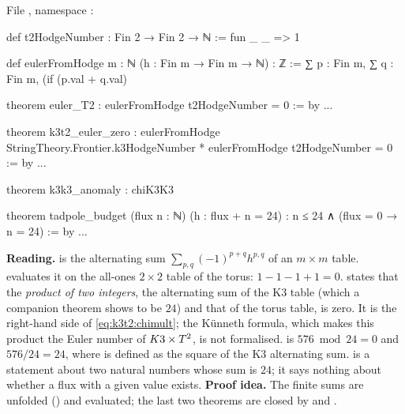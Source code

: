 \begin{leanbox}
File , namespace :
\begin{leancode}
def t2HodgeNumber : Fin 2 → Fin 2 → ℕ := fun _ _ => 1

def eulerFromHodge {m : ℕ} (h : Fin m → Fin m → ℕ) : ℤ :=
  ∑ p : Fin m, ∑ q : Fin m,
    (if (p.val + q.val) %

theorem euler_T2 : eulerFromHodge t2HodgeNumber = 0 := by ...

theorem k3t2_euler_zero :
    eulerFromHodge StringTheory.Frontier.k3HodgeNumber
      * eulerFromHodge t2HodgeNumber = 0 := by ...

theorem k3k3_anomaly : chiK3K3 %

theorem tadpole_budget (flux n : ℕ) (h : flux + n = 24) :
    n ≤ 24 ∧ (flux = 0 → n = 24) := by ...
\end{leancode}
\textbf{Reading.}  is the alternating sum
$\sum_{p,q}(-1)^{p+q}h^{p,q}$ of an $m\times m$ table.  evaluates it on the
all-ones $2\times2$ table of the torus: $1-1-1+1=0$.  states that the
\emph{product of two integers}, the alternating sum of the K3 table (which a companion theorem
 shows to be $24$) and that of the torus table, is zero. It is the right-hand
side of \eqref{eq:k3t2:chimult}; the K\"unneth formula, which makes this product the Euler
number of $K3\times T^2$, is not formalised.  is $576\bmod 24=0$ and $576/24=24$,
where  is defined as the square of the K3 alternating sum.
 is a statement about two natural numbers whose sum is $24$; it says
nothing about whether a flux with a given value exists. \textbf{Proof idea.} The finite sums
are unfolded () and evaluated; the last two theorems are closed by
 and .
\end{leanbox}

